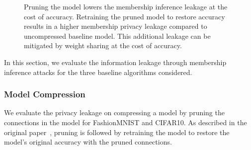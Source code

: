 \begin{figure}[!htb]
    \centering
{}
\hspace{4mm}
\hspace{4mm}
\vspace{-1mm}
    \caption{Pruning the model lowers the membership inference leakage at the cost of accuracy. Retraining the pruned model to restore accuracy results in a higher membership privacy leakage compared to uncompressed baseline model. This additional leakage can be mitigated by weight sharing at the cost of accuracy.}
    \label{fig:NIAcause}
\end{figure}

In this section, we evaluate the information leakage through membership inference attacks for the three baseline algorithms considered.

\subsubsection{Model Compression}

We evaluate the privacy leakage on compressing a model by pruning the connections in the model for FashionMNIST and CIFAR10.
As described in the original paper~\cite{Han:2015:LBW:2969239.2969366,DBLP:journals/corr/HanPNMTECTD16}, pruning is followed by retraining the model to restore the model's original accuracy with the pruned connections.

